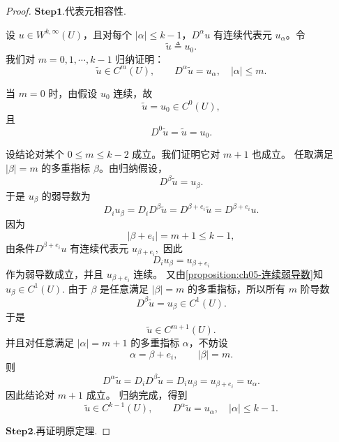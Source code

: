 \documentclass[../../main.tex]{subfiles}
\begin{document}
\begin{proof}

\noindent$\mathbf{Step1}.${\heiti 代表元相容性.}

设 \(u\in W^{k,\infty}(U)\)，且对每个 \(|\alpha|\leqslant k-1\)，\(D^\alpha u\) 有连续代表元 \(u_\alpha\)。令
\[
\widetilde u\triangleq u_0.
\]
我们对 \(m=0,1,\cdots,k-1\) 归纳证明：
\[
\widetilde u\in C^m(U),
\qquad
D^\alpha\widetilde u=u_\alpha,
\quad
|\alpha|\leqslant m.
\]

当 \(m=0\) 时，由假设 \(u_0\) 连续，故
\[
\widetilde u=u_0\in C^0(U),
\]
且
\[
D^0\widetilde u=\widetilde u=u_0.
\]

设结论对某个 \(0\leqslant m\leqslant k-2\) 成立。我们证明它对 \(m+1\) 也成立。
任取满足 \(|\beta|=m\) 的多重指标 \(\beta\)。由归纳假设，
\[
D^\beta\widetilde u=u_\beta.
\]
于是 \(u_\beta\) 的弱导数为
\[
D_i u_\beta
=
D_iD^\beta\widetilde u
=
D^{\beta+e_i}\widetilde u
=
D^{\beta+e_i}u.
\]
因为
\[
|\beta+e_i|=m+1\leqslant k-1,
\]
由条件\(D^{\beta+e_i}u\) 有连续代表元
$u_{\beta+e_i},$
因此
\[
D_i u_\beta=u_{\beta+e_i}
\]
作为弱导数成立，并且 \(u_{\beta+e_i}\) 连续。
又由\cref{proposition:ch05-连续弱导数}知\(u_\beta\in C^1(U)\).
由于 \(\beta\) 是任意满足 \(|\beta|=m\) 的多重指标，所以所有 \(m\) 阶导数
\[
D^\beta\widetilde u=u_\beta\in C^1(U).
\]
于是
\[
\widetilde u\in C^{m+1}(U).
\]
并且对任意满足 \(|\alpha|=m+1\) 的多重指标 \(\alpha\)，不妨设
\[
\alpha=\beta+e_i,
\qquad
|\beta|=m.
\]
则
\[
D^\alpha\widetilde u
=
D_iD^\beta\widetilde u
=
D_i u_\beta
=
u_{\beta+e_i}
=
u_\alpha.
\]
因此结论对 \(m+1\) 成立。
归纳完成，得到
\[
\widetilde u\in C^{k-1}(U),
\qquad
D^\alpha\widetilde u=u_\alpha,
\quad
|\alpha|\leqslant k-1.
\]

\noindent$\mathbf{Step2}.${\heiti 再证明原定理}.


\end{proof}
\end{document}
